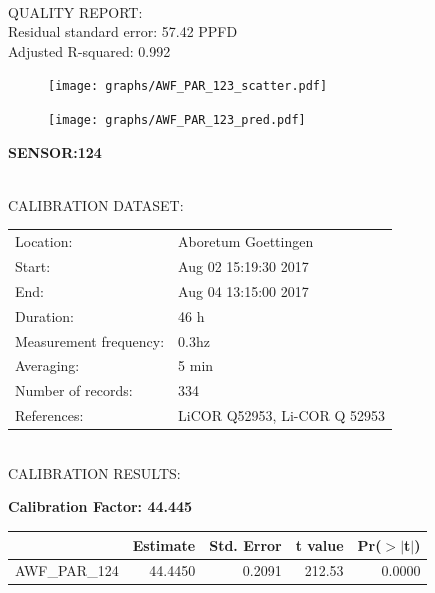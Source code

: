 \documentclass[oneside]{report}
\begin{document}
\hrulefill\\
QUALITY REPORT:\\
Residual standard error: 57.42 PPFD\\
Adjusted R-squared: 0.992



\begin{figure}[H]
  \centering
  \texttt{[image: graphs/AWF\_PAR\_123\_scatter.pdf]}
\end{figure}




\begin{figure}[H]
  \centering
  \texttt{[image: graphs/AWF\_PAR\_123\_pred.pdf]}
\end{figure}

\pagebreak


\begin{center}
\large{\textbf{SENSOR:124}}\\
\end{center}

\hrulefill\\
CALIBRATION DATASET:\\
\begin{table}[h!]
  \centering
  \label{tab:table1}
  \begin{tabular}{ll}
    Location: & Aboretum Goettingen\\ 
    
    
    Start:  & Aug 02 15:19:30 2017 \\
    End:   & Aug 04 13:15:00 2017\\ 
    Duration: & 46 h\\
    Measurement frequency: & 0.3hz\\
    Averaging:  &5 min\\
    Number of records: & 334 \\
    References: & LiCOR Q52953, Li-COR Q 52953 \\
  \end{tabular}
\end{table}

\hrulefill\\
CALIBRATION RESULTS:\\


\begin{center}
\textbf{\large{Calibration Factor: 44.445}}\\
\end{center}
\begin{table}[ht]
\centering
\begin{tabular}{rrrrr}
  \hline
 & Estimate & Std. Error & t value & Pr($>$$|$t$|$) \\ 
  \hline
AWF\_PAR\_124 & 44.4450 & 0.2091 & 212.53 & 0.0000 \\ 
   \hline
\end{tabular}
\end{table}
\end{document}
